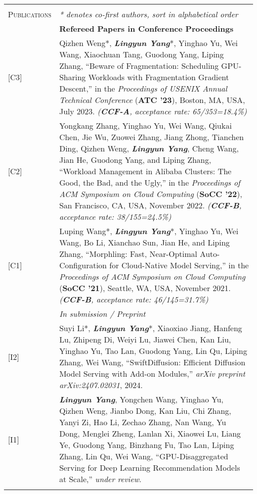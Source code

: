 \documentclass[letterpaper, 10pt]{article}
\begin{document}
\begin{longtable}{p{0.7in}p{6.0in}}
& \\

\nohyphens{\textsc{Publications}}
& \textit{* denotes co-first authors, sort in alphabetical order} \\
& \textbf{Refereed Papers in Conference Proceedings} \\
\hfill [C3]
& Qizhen Weng*, \textbf{\emph{Lingyun Yang}}*, Yinghao Yu, Wei Wang, Xiaochuan Tang, Guodong Yang, Liping Zhang, “Beware of Fragmentation: Scheduling GPU-Sharing Workloads with Fragmentation Gradient Descent,” in the \textit{Proceedings of USENIX Annual Technical Conference} (\textbf{ATC '23}), Boston, MA, USA, July 2023. \textit{(\textbf{CCF-A}, acceptance rate: 65/353=18.4\%)} \\
\hfill [C2]
& Yongkang Zhang, Yinghao Yu, Wei Wang, Qiukai Chen, Jie Wu, Zuowei Zhang, Jiang Zhong, Tianchen Ding, Qizhen Weng, \textbf{\emph{Lingyun Yang}}, Cheng Wang, Jian He, Guodong Yang, and Liping Zhang, “Workload Management in Alibaba Clusters: The Good, the Bad, and the Ugly,” in the \textit{Proceedings of ACM Symposium on Cloud Computing} (\textbf{SoCC '22}), San Francisco, CA, USA, November 2022. \textit{(\textbf{CCF-B}, acceptance rate: 38/155=24.5\%)} \\
\hfill [C1]
& Luping Wang*, \textbf{\emph{Lingyun Yang}}*, Yinghao Yu, Wei Wang, Bo Li, Xianchao Sun, Jian He, and Liping Zhang, “Morphling: Fast, Near-Optimal Auto-Configuration for Cloud-Native Model Serving,” in the \textit{Proceedings of ACM Symposium on Cloud Computing} (\textbf{SoCC '21}), Seattle, WA, USA, November 2021. \textit{(\textbf{CCF-B}, acceptance rate: 46/145=31.7\%)} \\
& \textit{In submission / Preprint} \\
\hfill [I2]
& Suyi Li*, \textbf{\emph{Lingyun Yang}}*, Xiaoxiao Jiang, Hanfeng Lu, Zhipeng Di, Weiyi Lu, Jiawei Chen, Kan Liu, Yinghao Yu, Tao Lan, Guodong Yang, Lin Qu, Liping Zhang, Wei Wang, “SwiftDiffusion: Efficient Diffusion Model Serving with Add-on Modules,” \textit{arXiv preprint arXiv:2407.02031}, 2024. \\
\hfill [I1]
& \textbf{\emph{Lingyun Yang}}, Yongchen Wang, Yinghao Yu, Qizhen Weng, Jianbo Dong, Kan Liu, Chi Zhang, Yanyi Zi, Hao Li, Zechao Zhang, Nan Wang, Yu Dong, Menglei Zheng, Lanlan Xi, Xiaowei Lu, Liang Ye, Guodong Yang, Binzhang Fu, Tao Lan, Liping Zhang, Lin Qu, Wei Wang, “GPU-Disaggregated Serving for Deep Learning Recommendation Models at Scale,” \textit{under review}. \\
& \\


\end{longtable}
\end{document}
